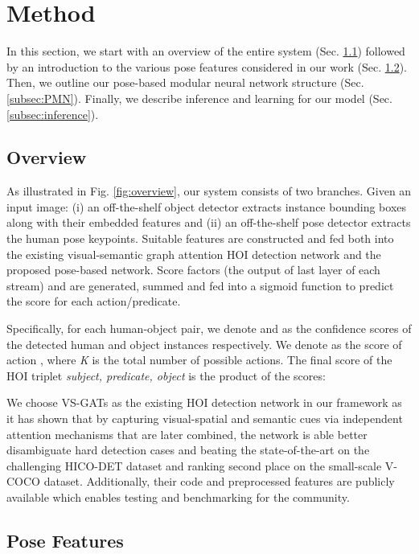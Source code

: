 \documentclass[10pt,twocolumn,letterpaper]{article}
\begin{document}
\section{Method}\label{sec:method}  
In this section,  we start with an overview of the entire system (Sec. \ref{subsec:overview}) followed by an introduction to the various pose features considered in our work (Sec. \ref{subsec:relatedFeatures}). Then, we outline our pose-based modular neural network structure (Sec. \ref{subsec:PMN}). Finally, we describe inference and learning for our model (Sec. \ref{subsec:inference}).
\subsection{Overview}\label{subsec:overview} 
As illustrated in Fig. \ref{fig:overview}, our system consists of two branches. Given an input image: (i) an off-the-shelf object detector \cite{renNIPS15fasterrcnn} extracts instance bounding boxes along with their embedded features and (ii) an off-the-shelf pose detector \cite{he2017mask} extracts the human pose keypoints. Suitable features are constructed and fed both into the existing visual-semantic graph attention HOI detection network and the proposed pose-based network. Score factors (the output of last layer of each stream)  and  are generated, summed and fed into a sigmoid function to predict the score for each action/predicate.

Specifically, for each human-object pair, we denote  and  as the confidence scores of the detected human and object instances respectively. We denote  as the score of action , where \textit{K} is the total number of possible actions. The final score of the HOI triplet \textit{subject, predicate, object} is the product of the scores:

We choose VS-GATs \cite{liang2020visualsemantic} as the existing HOI detection network in our framework as it has shown that by capturing visual-spatial and semantic cues via independent attention mechanisms that are later combined, the network is able better disambiguate hard detection cases and beating the state-of-the-art on the challenging HICO-DET dataset and ranking second place on the small-scale V-COCO dataset. Additionally, their code and preprocessed features are publicly available which enables testing and benchmarking for the community.  
\subsection{Pose Features} \label{subsec:relatedFeatures}
\end{document}
